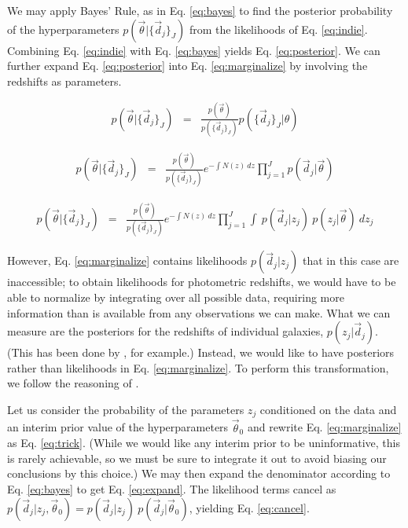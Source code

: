 \documentclass[12pt, onecolumn]{emulateapj}
\begin{document}
We may apply Bayes' Rule, as in Eq. \ref{eq:bayes} to find the posterior probability of the hyperparameters $p(\vec{\theta}|\{\vec{d}_{j}\}_{J})$ from the likelihoods of Eq. \ref{eq:indie}.  Combining Eq. \ref{eq:indie} with Eq. \ref{eq:bayes} yields Eq. \ref{eq:posterior}.  We can further expand Eq. \ref{eq:posterior} into Eq. \ref{eq:marginalize} by involving the redshifts as parameters.

\begin{eqnarray}
\label{eq:bayes}
p(\vec{\theta}|\{\vec{d}_{j}\}_{J}) &=& \frac{p(\vec{\theta})}{p(\{\vec{d}_{j}\}_{J})}p(\{\vec{d}_{j}\}_{J}|\theta)
\end{eqnarray}

\begin{eqnarray}
\label{eq:posterior}
p(\vec{\theta}|\{\vec{d}_{j}\}_{J}) &=& \frac{p(\vec{\theta})}{p(\{\vec{d}_{j}\}_{J})}e^{-\int N(z)\ dz}\prod_{j=1}^{J}p(\vec{d}_{j}|\vec{\theta})
\end{eqnarray}

\begin{eqnarray}
\label{eq:marginalize}
p(\vec{\theta}|\{\vec{d}_{j}\}_{J}) &=& \frac{p(\vec{\theta})}{p(\{\vec{d}_{j}\}_{J})}e^{-\int N(z)\ dz}\prod_{j=1}^{J}\int\ p(\vec{d}_{j}|z_{j})\ p(z_{j}|\vec{\theta})\ dz_{j}
\end{eqnarray}

However, Eq. \ref{eq:marginalize} contains likelihoods $p(\vec{d}_{j}|z_{j})$ that in this case are inaccessible; to obtain likelihoods for photometric redshifts, we would have to be able to normalize by integrating over all possible data, requiring more information than is available from any observations we can make.  What we can measure are the posteriors for the redshifts of individual galaxies, $p(z_{j}|\vec{d}_{j})$.  (This has been done by \citet{she11}, for example.)  Instead, we would like to have posteriors rather than likelihoods in Eq. \ref{eq:marginalize}.  To perform this transformation, we follow the reasoning of \citet{mar15}.  

Let us consider the probability of the parameters $z_{j}$ conditioned on the data and an interim prior value of the hyperparameters $\vec{\theta}_{0}$ and rewrite Eq. \ref{eq:marginalize} as Eq. \ref{eq:trick}.  (While we would like any interim prior to be uninformative, this is rarely achievable, so we must be sure to integrate it out to avoid biasing our conclusions by this choice.)  We may then expand the denominator according to Eq. \ref{eq:bayes} to get Eq. \ref{eq:expand}.  The likelihood terms cancel as $p(\vec{d}_{j}|z_{j},\vec{\theta}_{0})=p(\vec{d}_{j}|z_{j})\ p(\vec{d}_{j}|\vec{\theta}_{0})$, yielding Eq. \ref{eq:cancel}.
\end{document}
